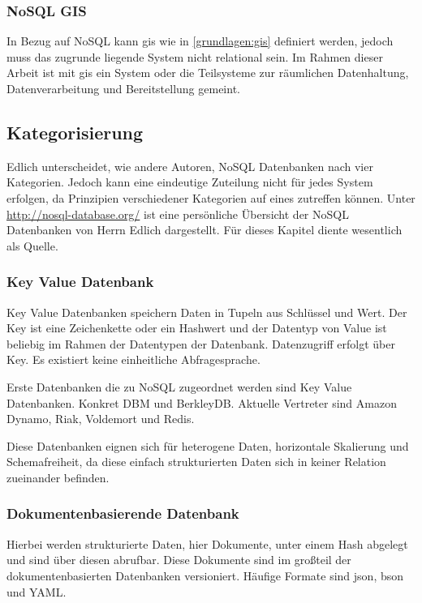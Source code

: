 \subsubsection{NoSQL GIS}

In Bezug auf NoSQL kann \Gls{gis} wie in \ref{grundlagen:gis} definiert werden, jedoch muss das zugrunde liegende System nicht relational sein.
Im Rahmen dieser Arbeit ist mit \Gls{gis} ein System oder die Teilsysteme zur räumlichen Datenhaltung, Datenverarbeitung und Bereitstellung gemeint.

\subsection{Kategorisierung}
Edlich unterscheidet, wie andere Autoren, NoSQL Datenbanken nach vier Kategorien.
Jedoch kann eine eindeutige Zuteilung nicht für jedes System erfolgen, da Prinzipien verschiedener Kategorien auf eines zutreffen können.
Unter \url{http://nosql-database.org/} ist eine persönliche Übersicht der NoSQL Datenbanken von Herrn Edlich dargestellt.
Für dieses Kapitel diente wesentlich \cite{beamer:nosql} als Quelle.


\subsubsection{Key Value Datenbank}

Key Value Datenbanken speichern Daten in Tupeln aus Schlüssel und Wert.
Der Key ist eine Zeichenkette oder ein Hashwert und der Datentyp von Value ist beliebig im Rahmen der Datentypen der Datenbank.
Datenzugriff erfolgt über Key.
Es existiert keine einheitliche Abfragesprache.

Erste Datenbanken die zu NoSQL zugeordnet werden sind Key Value Datenbanken. Konkret DBM und BerkleyDB.
Aktuelle Vertreter sind Amazon Dynamo, Riak, Voldemort und Redis.

Diese Datenbanken eignen sich für heterogene Daten, horizontale Skalierung und Schemafreiheit, da diese einfach strukturierten Daten sich in keiner Relation zueinander befinden.

\subsubsection{Dokumentenbasierende Datenbank}

Hierbei werden strukturierte Daten, hier Dokumente, unter einem Hash abgelegt und sind über diesen abrufbar.
Diese Dokumente sind im großteil der dokumentenbasierten Datenbanken versioniert.
Häufige Formate sind \Gls{json}, \Gls{bson} und YAML.

